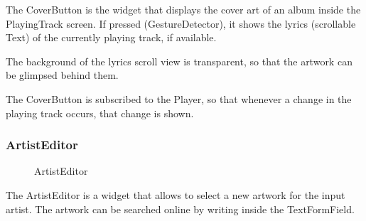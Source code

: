 \documentclass{article}
\begin{document}
The CoverButton is the widget that displays the cover art of an album inside the
PlayingTrack screen. If pressed (GestureDetector), it shows the lyrics
(scrollable Text) of the currently playing track, if available.

The background of the lyrics scroll view is transparent, so that the artwork can
be glimpsed behind them.

The CoverButton is subscribed to the Player, so that whenever a change in the
playing track occurs, that change is shown.

\subsubsection{ArtistEditor}

\begin{figure}[H]
	\noindent
	\caption{ArtistEditor} 
\end{figure}

The ArtistEditor is a widget that allows to select a new artwork for the input
artist. The artwork can be searched online by writing inside the TextFormField.
\end{document}
